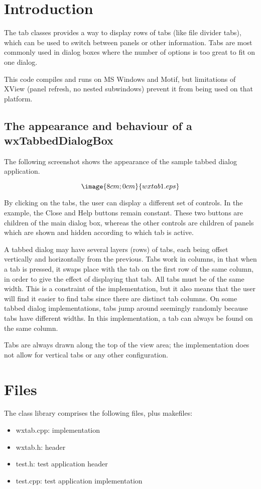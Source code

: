 \chapter{Introduction}\label{introduction}
%
%
\setfooter{\thepage}{}{}{}{}{\thepage}%

The tab classes provides a way to display rows of tabs (like file divider tabs), which can be
used to switch between panels or other information. Tabs are most
commonly used in dialog boxes where the number of options is too great
to fit on one dialog.

This code compiles and runs on MS Windows and Motif, but limitations of
XView (panel refresh, no nested subwindows) prevent it from being used
on that platform.

\section{The appearance and behaviour of a wxTabbedDialogBox}\label{appearance}

The following screenshot shows the appearance of the sample tabbed dialog application.

$$\image{8cm;0cm}{wxtab1.eps}$$

By clicking on the tabs, the user can display a different set of controls. In the example,
the Close and Help buttons remain constant. These two buttons are children of the main dialog box,
whereas the other controls are children of panels which are shown and hidden according to
which tab is active.

A tabbed dialog may have several layers (rows) of tabs, each being
offset vertically and horizontally from the previous. Tabs work in
columns, in that when a tab is pressed, it swaps place with the tab on
the first row of the same column, in order to give the effect of
displaying that tab. All tabs must be of the same width.
This is a constraint of the implementation, but it also
means that the user will find it easier to find tabs since there are
distinct tab columns. On some tabbed dialog implementations, tabs jump around
seemingly randomly because tabs have different widths.
In this implementation, a tab can always be found on the same column.

Tabs are always drawn along the top of the view area; the implementation does
not allow for vertical tabs or any other configuration.

\chapter{Files}\label{files}
%
\setfooter{\thepage}{}{}{}{}{\thepage}%

The class library comprises the following files, plus makefiles:

\begin{itemize}\itemsep=0pt
\item wxtab.cpp: implementation
\item wxtab.h: header
\item test.h: test application header
\item test.cpp: test application implementation
\end{itemize}

